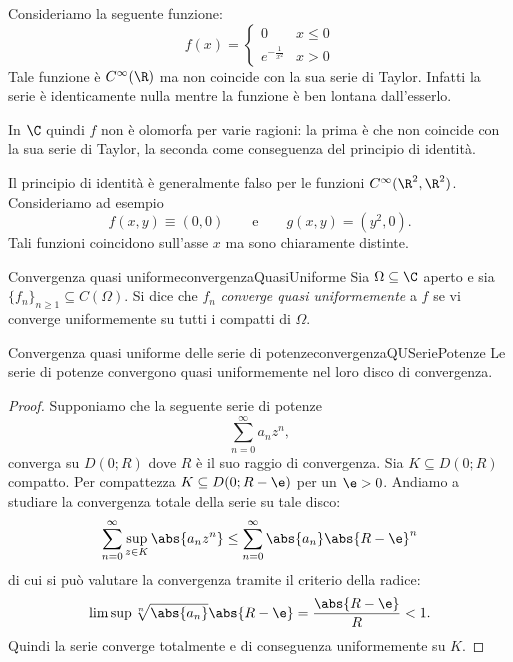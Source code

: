 \begin{oss}
	Consideriamo la seguente funzione:
	\[
		f(x) = 	\begin{cases}
			0                  & x\le 0 \\
			e^{-\frac{1}{x^2}} & x>0
		\end{cases}
	\]
	Tale funzione è \(C^{\infty}(\R)\) ma non coincide con la sua serie di Taylor.
	Infatti la serie è identicamente nulla mentre la funzione è ben lontana dall'esserlo.

	In \(\C\) quindi \(f\) non è olomorfa per varie ragioni: la prima è che non coincide con la sua serie di Taylor, la seconda come conseguenza del principio di identità.
\end{oss}

\begin{oss}
	Il principio di identità è generalmente falso per le funzioni \(C^{\infty}(\R^2,\R^2)\). Consideriamo ad esempio
	\[
		f(x,y) \equiv (0,0) \qquad\text{e}\qquad g(x,y) = (y^2,0).
	\]
	Tali funzioni coincidono sull'asse \(x\) ma sono chiaramente distinte.
\end{oss}

\begin{defn}{Convergenza quasi uniforme}{convergenzaQuasiUniforme}
	Sia \(\Omega\subseteq \C\) aperto e sia \(\{f_n\}_{n\ge 1}\subseteq C(\Omega)\).
	Si dice che \(f_n\) \emph{converge quasi uniformemente} a \(f\) se vi converge uniformemente su tutti i compatti di \(\Omega\).
\end{defn}

\begin{prop}{Convergenza quasi uniforme delle serie di potenze}{convergenzaQUSeriePotenze}
	Le serie di potenze convergono quasi uniformemente nel loro disco di convergenza.
\end{prop}

\begin{proof}
	Supponiamo che la seguente serie di potenze
	\[
		\sum_{n = 0}^\infty a_n z^n,
	\]
	converga su \(D(0;R)\) dove \(R\) è il suo raggio di convergenza.
	Sia \(K\subseteq D(0;R)\) compatto. Per compattezza \(K\subseteq D(0;R-\e)\) per un \(\e>0\).
	Andiamo a studiare la convergenza totale della serie su tale disco:
	\[
		\sum_{n=0}^\infty \sup_{z\in K} \abs{a_n z^n} \le \sum_{n=0}^\infty \abs{a_n}\abs{R-\e}^n
	\]
	di cui si può valutare la convergenza tramite il criterio della radice:
	\[
		\limsup \sqrt[n]{\abs{a_n}}\abs{R-\e} = \frac{\abs{R-\e}}{R} < 1.
	\]
	Quindi la serie converge totalmente e di conseguenza uniformemente su \(K\).
\end{proof}

